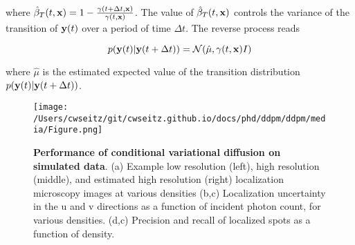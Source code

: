 where $\hat{\beta}_{T}(t,\bold{x}) = 1 - \frac{\gamma(t+\Delta t,\bold{x})}{\gamma(t,\bold{x})}$. The value of $\hat{\beta}_{T}(t,\bold{x})$ controls the variance of the transition of $\bold{y}(t)$ over a period of time $\Delta t$. The reverse process reads

\begin{equation*}
p(\bold{y}(t)\lvert\bold{y}(t+\Delta t)) = \mathcal{N}(\hat{\mu},\gamma(t,\bold{x})I)
\end{equation*}

where $\hat{\mu}$ is the estimated expected value of the transition distribution $p(\bold{y}(t)\lvert\bold{y}(t+\Delta t))$. 






\begin{figure}[t]
\centering
\texttt{[image: /Users/cwseitz/git/cwseitz.github.io/docs/phd/ddpm/ddpm/media/Figure.png]}
\caption{\textbf{Performance of conditional variational diffusion on simulated data}. (a) Example low resolution (left), high resolution (middle), and estimated high resolution (right) localization microscopy images at various densities (b,c) Localization uncertainty in the u and v directions as a function of incident photon count, for various densities. (d,c) Precision and recall of localized spots as a function of density.}
\label{fig:cvdmsim}
\end{figure}


